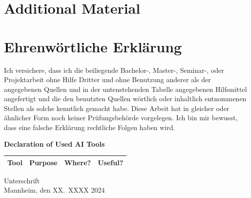\documentclass[a4paper,oneside,bibliography=totoc]{scrbook}
\begin{document}



\appendix
\chapter{Additional Material}
\label{ch:additional_material}


\backmatter
\chapter{Ehrenwörtliche Erklärung}
\label{ch:declaration}

Ich versichere, dass ich die beiliegende Bachelor-, Master-, Seminar-, oder
Projektarbeit ohne Hilfe Dritter und ohne Benutzung anderer als der angegebenen
Quellen und in der untenstehenden Tabelle angegebenen Hilfsmittel angefertigt
und die den benutzten Quellen wörtlich oder inhaltlich entnommenen Stellen als
solche kenntlich gemacht habe. Diese Arbeit hat in gleicher oder ähnlicher Form
noch keiner Prüfungsbehörde vorgelegen. Ich bin mir bewusst, dass eine falsche
Erklärung rechtliche Folgen haben wird.

\begin{center}
  \textbf{Declaration of Used AI Tools} \\[.3em]
  \begin{tabularx}{\textwidth}{lXlc}
    \toprule
    Tool & Purpose & Where? & Useful? \\
    \midrule
    \bottomrule
  \end{tabularx}
\end{center}

\vspace{2cm}
\noindent Unterschrift\\
\noindent Mannheim, den XX.~XXXX 2024 \hfill
\end{document}
